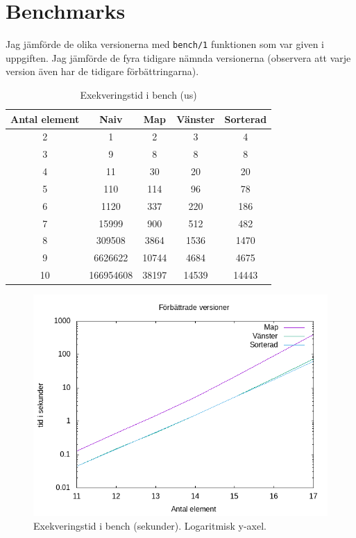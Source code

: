 \documentclass[a4paper,11pt]{article}
\begin{document}
\section*{Benchmarks}
Jag jämförde de olika versionerna med {\tt bench/1} funktionen som var given i uppgiften. Jag jämförde de fyra tidigare nämnda versionerna (observera att varje version även har de tidigare förbättringarna).
\begin{table}[H]
  \begin{center}
    \begin{tabular}{c|c|c|c|c}
      \textbf{Antal element} & \textbf{Naiv} & \textbf{Map} & \textbf{Vänster} & \textbf{Sorterad}\\
      \hline
      2&1&2&3&4\\
      3&9&8&8&8\\
      4&11&30&20&20\\
      5&110&114&96&78\\
      6&1120&337&220&186\\
      7&15999&900&512&482\\
      8&309508&3864&1536&1470\\
      9&6626622&10744&4684&4675\\
      10&166954608&38197&14539&14443\\
    \end{tabular}
    \caption{Exekveringstid i bench (us)}
    \label{tab:Tabell 1}
  \end{center}
\end{table}
\begin{figure}[H]
  \center
  \includegraphics[width=\linewidth]{./latex/images/bench_all_improvments_log.png}
  \caption{Exekveringstid i bench (sekunder). Logaritmisk y-axel.}
  \label{fig:bench_improvements_log}
\end{figure}
\end{document}
